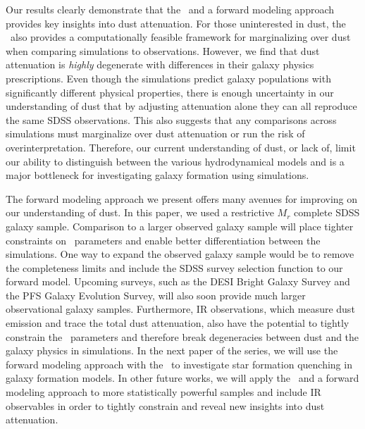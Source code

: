 Our results clearly demonstrate that the \eda~and a forward modeling approach
provides key insights into dust attenuation. For those uninterested in dust,
the \eda~also provides a computationally feasible framework for marginalizing
over dust when comparing simulations to observations. 
However, we find that dust attenuation is {\em highly} degenerate with
differences in their galaxy physics prescriptions.
Even though the simulations predict galaxy populations with significantly
different physical properties, there is enough uncertainty in our
understanding of dust that by adjusting attenuation alone they can all
reproduce the same SDSS observations.
This also suggests that any comparisons across simulations must marginalize
over dust attenuation or run the risk of overinterpretation. 
Therefore, our current understanding of dust, or lack of, limit our ability to
distinguish between the various hydrodynamical models and is a major bottleneck
for investigating galaxy formation using simulations.

The forward modeling approach we present offers many avenues for improving on
our understanding of dust. In this paper, we used a restrictive 
$M_r$ complete SDSS galaxy sample. Comparison to a larger observed galaxy
sample will place tighter constraints on \eda~parameters and enable better
differentiation between the simulations. One way to expand the observed galaxy
sample would be to remove the completeness limits and include the SDSS survey
selection function to our forward model. Upcoming surveys, such as the DESI
Bright Galaxy Survey and the PFS Galaxy Evolution Survey, will also soon
provide much larger observational galaxy samples. Furthermore, IR observations,
which measure dust emission and trace the total dust attenuation, also have the
potential to tightly constrain the \eda~parameters and therefore break degeneracies
between dust and the galaxy physics in simulations. 
In the next paper of the series, we will use the forward modeling approach
with the \eda~to investigate star formation quenching in galaxy formation
models. 
In other future works, we will apply the \eda~and a forward modeling approach
to more statistically powerful samples and include IR observables in order to
tightly constrain and reveal new insights into dust attenuation. 
